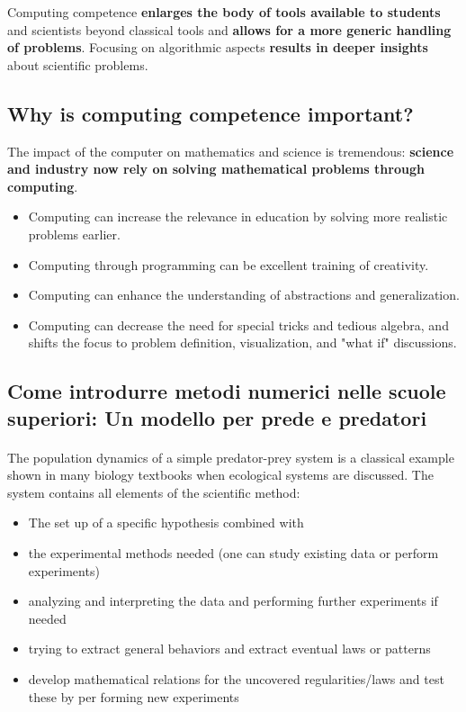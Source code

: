 \documentclass[%
oneside,                 %
final,                   %
10pt]{article}
\begin{document}
Computing competence \textbf{enlarges the body of tools available to students} and
scientists beyond classical tools and \textbf{allows for a more generic
handling of problems}. Focusing on algorithmic aspects \textbf{results in
deeper insights} about scientific problems.





\subsection{Why is computing competence important?}
The impact of the computer on mathematics and science is tremendous: \textbf{science and industry now rely on solving mathematical problems through computing}.
\begin{itemize}
\item Computing can increase the relevance in education by solving more realistic problems earlier.

\item Computing through programming can be excellent training of creativity.

\item Computing can enhance the understanding of abstractions and generalization.

\item Computing can decrease the need for special tricks and tedious algebra, and shifts the focus to problem definition, visualization, and "what if" discussions.
\end{itemize}

\noindent
\subsection{Come introdurre metodi numerici nelle scuole superiori: Un modello per prede e predatori}


\paragraph{}
The population dynamics of a simple predator-prey system is a
classical example shown in many biology textbooks when ecological
systems are discussed. The system contains all elements of the
scientific method:

\begin{itemize}
 \item The set up of a specific hypothesis combined with

 \item the experimental methods needed (one can study existing data or perform experiments)

 \item analyzing and interpreting the data and performing further experiments if needed

 \item trying to extract general behaviors and extract eventual laws or patterns

 \item develop mathematical relations for the uncovered regularities/laws and test these by per forming new experiments
\end{itemize}
\end{document}

